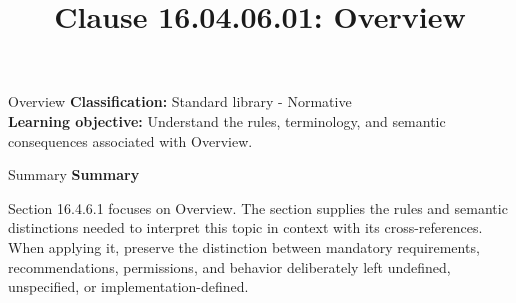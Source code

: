 \documentclass[10pt,letterpaper]{article}
\title{Clause 16.04.06.01: Overview}
\author{}
\date{}
\begin{document}
\maketitle
\begin{CornellOverviewBox}{Overview}
\textbf{Classification:} Standard library - Normative\\[2pt]
\textbf{Learning objective:} Understand the rules, terminology, and semantic consequences associated with Overview.
\end{CornellOverviewBox}\begin{CornellSummaryBox}{Summary}
{\sffamily\bfseries\color{Accent} Summary}\par\vspace{3pt}Section 16.4.6.1 focuses on Overview. The section supplies the rules and semantic distinctions needed to interpret this topic in context with its cross-references. When applying it, preserve the distinction between mandatory requirements, recommendations, permissions, and behavior deliberately left undefined, unspecified, or implementation-defined.
\end{CornellSummaryBox}
\end{document}
